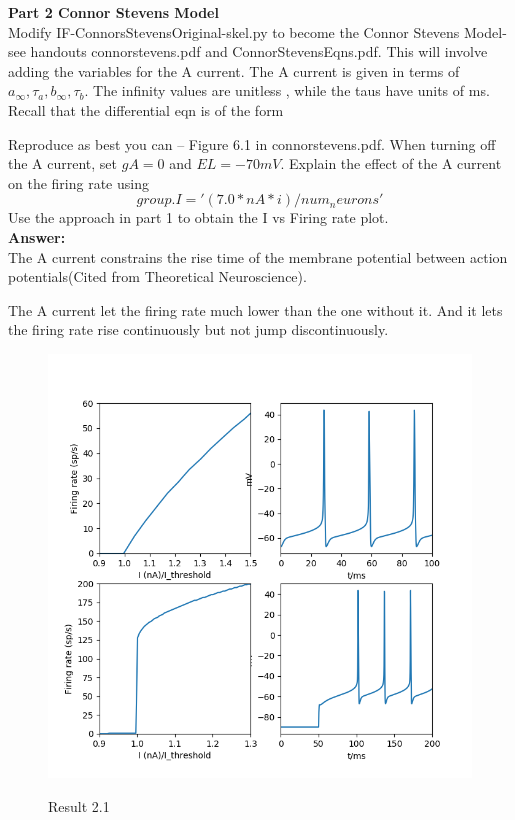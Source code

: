 \documentclass[12pt]{article}
\begin{document}
\newpage
\textbf{Part 2 Connor Stevens Model}
\\

Modify	IF-ConnorsStevensOriginal-skel.py	to	become	the	Connor	Stevens	Model- see
handouts	connorstevens.pdf	and	ConnorStevensEqns.pdf.	This	will	involve	adding	
the variables	for	the	A	current.	The	A	current	is	given	in	terms	of	$a_{\infty}, \tau_{a}, b_{\infty}, \tau_{b}  $.	The
infinity	values	are	unitless	,	while	the	taus	have	units	of	ms.	Recall	that	the	
differential eqn	is	of	the	form

Reproduce	as	best	you	can	– Figure	6.1	in	connorstevens.pdf.	When	turning	off	the	A
current,	set	$gA=0$	and	$EL=-70mV$.	Explain	the	effect	of	the	A	current	on	the	firing	
rate using
$$group.I	=	'(7.0*nA	*	i)	/	num_neurons'$$
Use	the	approach	in	part	1	to	obtain	the	I	vs	Firing	rate	plot.
\\

\textbf{Answer:} 
\\

The A current constrains the rise time of the membrane potential between action potentials(Cited from Theoretical Neuroscience).

The A current let the firing rate much lower than the one without it. And it lets the firing rate rise continuously but not jump discontinuously.
\\

 \begin{figure}[H]
  \centering
  \includegraphics[width=1.2\textwidth]{h2_p1.png} %
  \label{img} %
  \caption{Result 2.1}
\end{figure}
\end{document}
